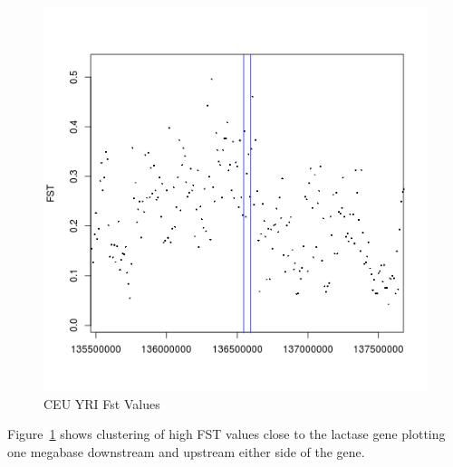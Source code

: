 \documentclass[a4paper,10pt]{article}
\begin{document}
\begin{figure}
\centering
\includegraphics{pictures/CEUYRI2.png}
\caption{CEU YRI Fst Values}
\label{fig:a}
\end{figure}
Figure~\ref{fig:a} shows clustering of high FST values close to the lactase gene plotting one megabase downstream and upstream either side of the gene. 
\end{document}
